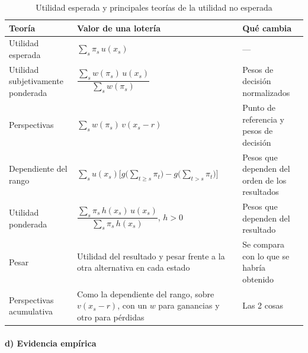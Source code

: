 \documentclass[11pt]{article}
\begin{document}
\begin{table}[H]
\centering
\caption{Utilidad esperada y principales teorías de la utilidad no esperada}\label{tab:no-esperada}
\renewcommand{\arraystretch}{1.25}
\begin{tabular}{>{\centering\arraybackslash}m{4cm}>{\centering\arraybackslash}m{6cm}>{\centering\arraybackslash}m{4.4cm}}
\toprule
\rowcolor{tceeazulpalido}
\textbf{Teoría} & \textbf{Valor de una lotería} & \textbf{Qué cambia}\\
\midrule
\rowcolor{tceesalvia}
Utilidad esperada\newline\nocite{VonNeumannMorgenstern1944Theory} & $\sum_s\pi_s\,u(x_s)$ & ---\\[4pt]
Utilidad subjetivamente ponderada\newline\nocite{Karmarkar1978Subjectively} & $\dfrac{\sum_s w(\pi_s)\,u(x_s)}{\sum_s w(\pi_s)}$ & Pesos de decisión normalizados\\[6pt]
Perspectivas\newline\nocite{KahnemanTversky1979Prospect} & $\sum_s w(\pi_s)\,v(x_s-r)$ & Punto de referencia y pesos de decisión\\[4pt]
Dependiente del rango\newline\nocite{Quiggin1982Theory} & $\sum_s u(x_s)\Big[g\big(\sum_{t\geq s}\pi_t\big)-g\big(\sum_{t>s}\pi_t\big)\Big]$ & Pesos que dependen del orden de los resultados\\[6pt]
Utilidad ponderada\newline\nocite{Chew1983Generalization} & $\dfrac{\sum_s \pi_s\,h(x_s)\,u(x_s)}{\sum_s \pi_s\,h(x_s)}$, $h>0$ & Pesos que dependen del resultado\\[6pt]
Pesar\newline\nocite{LoomesSugden1982Regret,Bell1982Regret} & Utilidad del resultado y pesar frente a la otra alternativa en cada estado & Se compara con lo que se habría obtenido\\[4pt]
Perspectivas acumulativa\newline\nocite{TverskyKahneman1992Advances} & Como la dependiente del rango, sobre $v(x_s-r)$, con un $w$ para ganancias y otro para pérdidas & Las 2 cosas\\
\bottomrule
\end{tabular}
\end{table}

\paragraph{d) Evidencia empírica}
\end{document}
